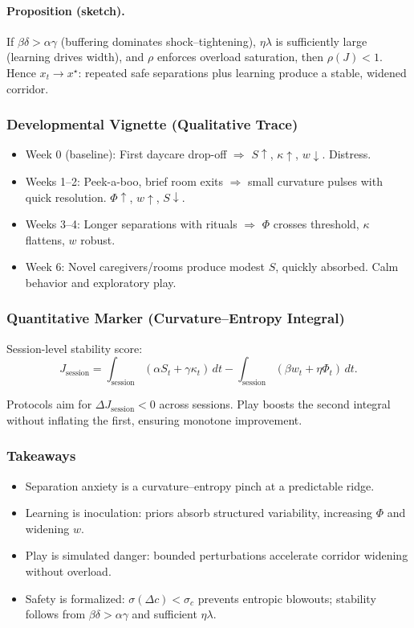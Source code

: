 \documentclass{article}
\theoremstyle{definition}
\begin{document}
\paragraph{Proposition (sketch).}  
If $\beta \delta > \alpha \gamma$ (buffering dominates shock–tightening), $\eta \lambda$ is sufficiently large (learning drives width), and $\rho$ enforces overload saturation, then $\rho(J) < 1$. Hence $x_t \to x^\star$: repeated safe separations plus learning produce a stable, widened corridor.

\subsubsection{Developmental Vignette (Qualitative Trace)}

\begin{itemize}
\item Week 0 (baseline): First daycare drop-off $\Rightarrow$ $S \!\uparrow$, $\kappa \!\uparrow$, $w \!\downarrow$. Distress.
\item Weeks 1–2: Peek-a-boo, brief room exits $\Rightarrow$ small curvature pulses with quick resolution. $\Phi \!\uparrow$, $w \!\uparrow$, $S \!\downarrow$.
\item Weeks 3–4: Longer separations with rituals $\Rightarrow$ $\Phi$ crosses threshold, $\kappa$ flattens, $w$ robust.
\item Week 6: Novel caregivers/rooms produce modest $S$, quickly absorbed. Calm behavior and exploratory play.
\end{itemize}

\subsubsection{Quantitative Marker (Curvature–Entropy Integral)}

Session-level stability score:
\[
J_{\mathrm{session}} = \int_{\mathrm{session}} (\alpha S_t + \gamma \kappa_t)\, dt
 - \int_{\mathrm{session}} (\beta w_t + \eta \Phi_t)\, dt.
\]

Protocols aim for $\Delta J_{\mathrm{session}} < 0$ across sessions. Play boosts the second integral without inflating the first, ensuring monotone improvement.

\subsubsection{Takeaways}

\begin{itemize}
\item Separation anxiety is a curvature–entropy pinch at a predictable ridge.  
\item Learning is inoculation: priors absorb structured variability, increasing $\Phi$ and widening $w$.  
\item Play is simulated danger: bounded perturbations accelerate corridor widening without overload.  
\item Safety is formalized: $\sigma(\Delta c) < \sigma_c$ prevents entropic blowouts; stability follows from $\beta \delta > \alpha \gamma$ and sufficient $\eta \lambda$.  
\end{itemize}
\end{document}
